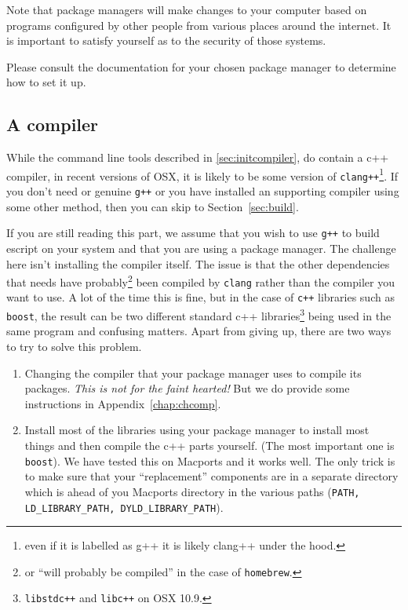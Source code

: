 Note that package managers will make changes to your computer based on programs configured by other people from 
various places around the internet.
It is important to satisfy yourself as to the security of those systems.

Please consult the documentation for your chosen package manager to determine how to set it up.

\subsection{A compiler}\label{sec:osxcompiler}
While the command line tools described in \ref{sec:initcompiler}, do contain a c++ compiler, in recent versions of OSX, 
it is likely to be some version of \texttt{clang++}\footnote{even if it is 
labelled as g++ it is likely clang++ under the hood.}.
If you don't need \openmp or genuine \texttt{g++} or you have installed an \openmp supporting compiler
using some other method, then you can skip to Section~\ref{sec:build}.

If you are still reading this part, we assume that you wish to use \texttt{g++} to build escript on your system and that you are 
using a package manager.
The challenge here isn't installing the compiler itself. 
The issue is that the other dependencies that \escript needs have 
probably\footnote{or ``will probably be compiled'' in the case of \texttt{homebrew}.} been compiled by \texttt{clang} rather than the compiler 
you want to use.
A lot of the time this is fine, but in the case of \texttt{c++} libraries such as \texttt{boost}, the result can be two different 
standard c++ libraries\footnote{\texttt{libstdc++} and \texttt{libc++} on OSX 10.9.} being used in the same program and confusing matters.
Apart from giving up, there are two ways to try to solve this problem.
\begin{enumerate}
\item Changing the compiler that your package manager uses to compile its packages.
\emph{This is not for the faint hearted!} But we do provide some instructions in Appendix~\ref{chap:chcomp}.
\item Install most of the libraries using your package manager to install most things and then compile the c++ parts yourself.
(The most important one is \texttt{boost}).
We have tested this on Macports and it works well. The only trick is to make sure that your ``replacement'' components are in a separate 
directory which is ahead of you Macports directory in the various paths (\texttt{PATH, LD\_LIBRARY\_PATH, DYLD\_LIBRARY\_PATH}).
\end{enumerate}




